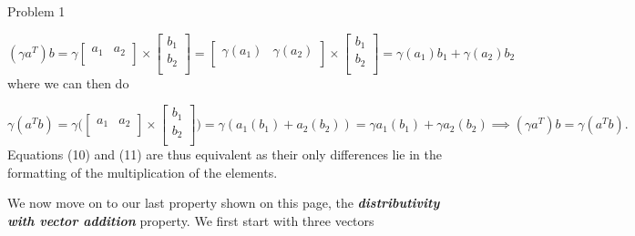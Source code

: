 \begin{problem}{Problem 1}
\begin{Highlight}
        \begin{equation}
            (\gamma a^{T})b = \gamma
            \begin{bmatrix}
                a_{1} & a_{2} \\
            \end{bmatrix}
            \times
            \begin{bmatrix}
                b_{1} \\
                b_{2} \\
            \end{bmatrix}
            = 
            \begin{bmatrix}
                \gamma(a_{1}) & \gamma(a_{2}) \\
            \end{bmatrix}
            \times
            \begin{bmatrix}
                b_{1} \\
                b_{2} \\
            \end{bmatrix}
            = \gamma(a_{1})b_{1} + \gamma(a_{2})b_{2}
        \end{equation}
        where we can then do

        \begin{equation}
            \gamma(a^{T}b) = \gamma \Bigg(
            \begin{bmatrix}
                a_{1} & a_{2} \\
            \end{bmatrix}
            \times
            \begin{bmatrix}
                b_{1} \\
                b_{2} \\
            \end{bmatrix}
            \Bigg) = \gamma (a_{1}(b_{1}) + a_{2}(b_{2})) = \gamma a_{1}(b_{1}) + \gamma a_{2}(b_{2}) \implies (\gamma a^{T})b = \gamma(a^{T}b).
        \end{equation}
        Equations (10) and (11) are thus equivalent as their only differences lie in the formatting of the multiplication of the elements.

        We now move on to our last property shown on this page, the \textbf{\textit{distributivity with vector addition}} property. We first start with three vectors


\end{Highlight}
\end{problem}
